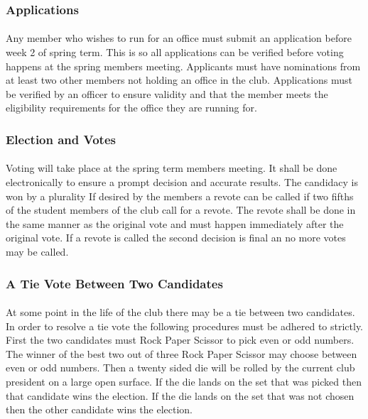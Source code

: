 \documentclass[12pt]{article}
\begin{document}
\subsubsection{Applications}
\paragraph{}
Any member who wishes to run for an office must submit an application before week 2 of spring term. 
This is so all applications can be verified before voting happens at the spring members meeting. 
Applicants must have nominations from at least two other members not holding an office in the club. 
Applications must be verified by an officer to ensure validity and that the member meets the eligibility requirements for the office they are running for.


\subsubsection{Election and Votes}
\paragraph{}
Voting will take place at the spring term members meeting. 
It shall be done electronically to ensure a prompt decision and accurate results. 
The candidacy is won by a plurality
If desired by the members a revote can be called if two fifths of the student members of the club call for a revote. 
The revote shall be done in the same manner as the original vote and must happen immediately after
the original vote.
If a revote is called the second decision is final an no more votes may be called. 

\subsubsection{A Tie Vote Between Two Candidates}
\paragraph{}
At some point in the life of the club there may be a tie between two candidates. In order to resolve a tie vote the following procedures must be adhered to strictly. First the two candidates must Rock Paper Scissor to pick even or odd numbers. The winner of the best two out of three Rock Paper Scissor may choose between even or odd numbers. Then a twenty sided die will be rolled by the current club president on a large open surface. If the die lands on the set that was picked then that candidate wins the election. If the die lands on the set that was not chosen then the other candidate wins the election.
\end{document}
